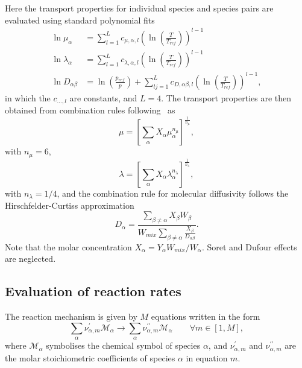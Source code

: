 \documentclass[notitlepage]{revtex4-1}
\begin{document}
Here the transport properties for individual species and species pairs are evaluated using standard polynomial fits~\cite{kee_1986}
\begin{subequations}\begin{align}
\ln\mu_{\alpha}&=\displaystyle\sum_{l=1}^{L}c_{\mu,\alpha,l}\left(\ln\left(\frac{T}{T_{ref}}\right)\right)^{l-1}\\
\ln\lambda_{\alpha}&=\displaystyle\sum_{l=1}^{L}c_{\lambda,\alpha,l}\left(\ln\left(\frac{T}{T_{ref}}\right)\right)^{l-1}\\
\ln{D}_{\alpha\beta}&=\ln\left(\frac{p_{ref}}{p}\right)+\displaystyle\sum_{lj=1}^{L}c_{D,\alpha\beta,l}\left(\ln\left(\frac{T}{T_{ref}}\right)\right)^{l-1},
\end{align}\end{subequations}
in which the $c_{\dots,l}$ are constants, and $L=4$. The transport properties are then obtained from combination rules following~\cite{ern_1994,ern_1995} as
\begin{equation}\mu=\left[\displaystyle\sum_{\alpha}X_{\alpha}\mu_{\alpha}^{n_{\mu}}\right]^{\frac{1}{n_{\mu}}},\end{equation}
with $n_{\mu}=6$, 
\begin{equation}\lambda=\left[\displaystyle\sum_{\alpha}X_{\alpha}\lambda_{\alpha}^{n_{\lambda}}\right]^{\frac{1}{n_{\lambda}}},\end{equation}
with $n_{\lambda}=1/4$, and the combination rule for molecular diffusivity follows the Hirschfelder-Curtiss approximation~\cite{hirschfelder_curtiss}
\begin{equation}D_{\alpha}=\frac{\displaystyle\sum_{\beta\ne\alpha}X_{\beta}{W}_{\beta}}{W_{mix}\displaystyle\sum_{\beta\ne\alpha}\frac{X_{\beta}}{D_{\alpha\beta}}}.\end{equation}
Note that the molar concentration $X_{\alpha}=Y_{\alpha}W_{mix}/W_{\alpha}$.
Soret and Dufour effects are neglected.

\subsection{Evaluation of reaction rates}

The reaction mechanism is given by $M$ equations written in the form
\begin{equation}\displaystyle\sum_{\alpha}\nu_{\alpha,m}^{\prime}\mathcal{M}_{\alpha}\rightarrow\displaystyle\sum_{\alpha}\nu_{\alpha,m}^{\prime\prime}\mathcal{M}_{\alpha}\qquad\forall{m}\in\left[1,M\right],\end{equation}
where $\mathcal{M}_{\alpha}$ symbolises the chemical symbol of species $\alpha$, and 
$\nu_{\alpha,m}^{\prime}$ and $\nu_{\alpha,m}^{\prime\prime}$ are the molar stoichiometric coefficients of species $\alpha$ in equation $m$.
\end{document}
